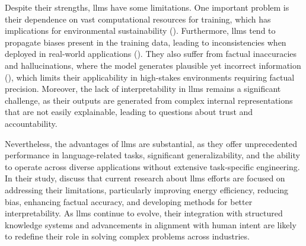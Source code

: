 Despite their strengths, \glspl{llm} have some limitations.
One important problem is their dependence on vast computational resources for training, which has implications for environmental sustainability (\cite{Strubell2019EnergyAP}).
Furthermore, \glspl{llm} tend to propagate biases present in the training data, leading to inconsistencies when deployed in real-world applications (\cite{Naveed2023}).
They also suffer from factual inaccuracies and hallucinations, where the model generates plausible yet incorrect information (\cite{Chang2024}), which limits their applicability in high-stakes environments requiring factual precision.
Moreover, the lack of interpretability in \glspl{llm} remains a significant challenge, as their outputs are generated from complex internal representations that are not easily explainable, leading to questions about trust and accountability.

Nevertheless, the advantages of \glspl{llm} are substantial, as they offer unprecedented performance in language-related tasks, significant generalizability, and the ability to operate across diverse applications without extensive task-specific engineering.
In their study, \cite{Naveed2023} discuss that current research about \glspl{llm} efforts are focused on addressing their limitations, particularly improving energy efficiency, reducing bias, enhancing factual accuracy, and developing methods for better interpretability.
As \glspl{llm} continue to evolve, their integration with structured knowledge systems and advancements in alignment with human intent are likely to redefine their role in solving complex problems across industries.